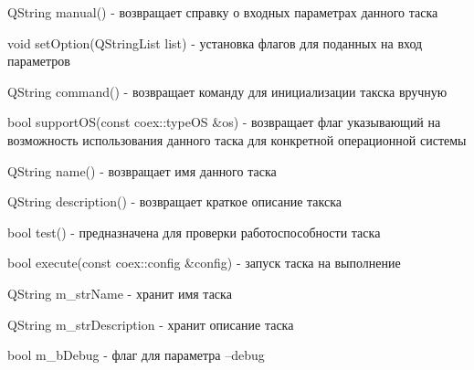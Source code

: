 QString manual() - возвращает справку о входных параметрах данного таска

void setOption(QStringList list) - установка флагов для поданных на вход параметров

QString command() - возвращает команду для инициализации такска вручную

bool supportOS(const coex::typeOS \&os) - возвращает флаг указывающий на возможность использования данного таска для конкретной операционной системы

QString name() - возвращает имя данного таска

QString description() - возвращает краткое описание такска

bool test() - предназначена для проверки работоспособности таска

bool execute(const coex::config \&config) - запуск таска на выполнение

QString m\_strName - хранит имя таска

QString m\_strDescription - хранит описание таска

bool m\_bDebug - флаг для параметра –debug
